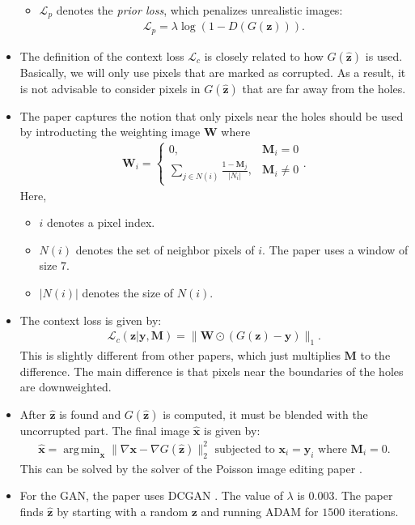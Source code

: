\documentclass[10pt]{article}
\newcommand{\ve}[1]{\mathbf{#1}}
\DeclareMathOperator*{\argmin}{arg\,min}
\begin{document}
\begin{itemize}
\begin{itemize}
  		\item $\mathcal{L}_p$ denotes the \emph{prior loss}, which penalizes unrealistic images:
  		\begin{align*}
  			\mathcal{L}_p = \lambda \log (1 - D(G(\ve{z}))).
  		\end{align*}
  	\end{itemize}

  	\item The definition of the context loss $\mathcal{L}_c$ is closely related to how $G(\hat{\ve{z}})$ is used. Basically, we will only use pixels that are marked as corrupted. As a result, it is not advisable to consider pixels in $G(\hat{\ve{z}})$ that are far away from the holes.

  	\item The paper captures the notion that only pixels near the holes should be used by introducting the weighting image $\ve{W}$ where
  	\begin{align*}
  		\ve{W}_i = \begin{cases}
  			0, & \ve{M}_i = 0 \\
  			\sum_{j \in N(i)} \frac{1-\ve{M}_j}{|N_i|}, & \ve{M}_i \neq 0
  		\end{cases}.
  	\end{align*}
  	Here,
  	\begin{itemize}
  		\item $i$ denotes a pixel index.
  		\item $N(i)$ denotes the set of neighbor pixels of $i$. The paper uses a window of size $7$.
  		\item $|N(i)|$ denotes the size of $N(i)$.  		
  	\end{itemize}

  	\item The context loss is given by:
  	\begin{align*}
  		\mathcal{L}_c(\ve{z}|\ve{y}, \ve{M}) = \| \ve{W} \odot (G(\ve{z}) - \ve{y}) \|_1.
  	\end{align*}
  	This is slightly different from other papers, which just multiplies $\ve{M}$ to the difference. The main difference is that pixels near the boundaries of the holes are downweighted.

  	\item After $\hat{\ve{z}}$ is found and $G(\hat{\ve{z}})$ is computed, it must be blended with the uncorrupted part. The final image $\hat{\ve{x}}$ is given by:
  	\begin{align*}
  		\hat{\ve{x}} = \argmin_{\ve{x}} \| \nabla \ve{x} - \nabla G(\hat{\ve{z}}) \|_2^2
  		\mbox{ subjected to }
  		\ve{x}_i = \ve{y}_i\mbox{ where }\ve{M}_i = 0.
  	\end{align*}
  	This can be solved by the solver of the Poisson image editing paper \cite{Perez:2003}.

  	\item For the GAN, the paper uses DCGAN \cite{Radford:2015}. The value of $\lambda$ is $0.003$. The paper finds $\hat{\ve{z}}$ by starting with a random $\ve{z}$ and running ADAM for $1500$ iterations.
  \end{itemize}
\end{document}
